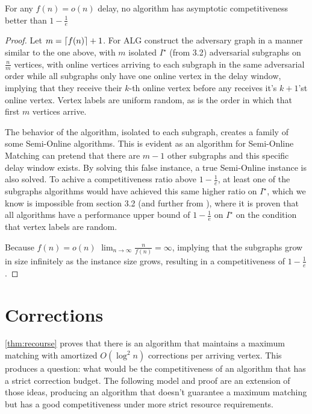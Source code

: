 \begin{theorem}
	For any $f(n)=o(n)$ delay, no algorithm has asymptotic competitiveness better than $1-\frac{1}{e}$
\end{theorem}
\begin{proof}
	Let $m=\left\lceil f(n) \right\rceil+1$.
	For $\mathrm{ALG}$ construct the adversary graph in a manner similar to the one above, with $m$ isolated $I^\star$ (from 3.2) adversarial subgraphs on $\frac{n}{m}$ vertices, with online vertices arriving to each subgraph in the same adversarial order while all subgraphs only have one online vertex in the delay window, implying that they receive their $k$-th online vertex before any receives it's $k+1$'st online vertex. Vertex labels are uniform random, as is the order in which that first $m$ vertices arrive.

	The behavior of the algorithm, isolated to each subgraph, creates a family of some Semi-Online algorithms. This is evident as an algorithm for Semi-Online Matching can pretend that there are $m-1$ other subgraphs and this specific delay window exists. By solving this false instance, a true Semi-Online instance is also solved. To achive a competitiveness ratio above $1-\frac{1}{e}$, at least one of the subgraphs algorithms would have achieved this same higher ratio on $I^\star$, which we know is impossible from section 3.2 (and further from \cite{karp}), where it is proven that all algorithms have a performance upper bound of $1-\frac{1}{e}$ on $I^\star$ on the condition that vertex labels are random.
	
	Because $f(n)=o(n)$ $\lim_{n\to\infty}\frac{n}{f(n)}=\infty$, implying that the subgraphs grow in size infinitely as the instance size grows, resulting in a competitiveness of $1-\frac{1}{e}$.
\end{proof}

\section{Corrections}
\autoref{thm:recourse} proves that there is an algorithm that maintains a maximum matching with amortized $O(\log^2n)$ corrections per arriving vertex. This produces a question: what would be the competitiveness of an algorithm that has a strict correction budget. The following model and proof are an extension of those ideas, producing an algorithm that doesn't guarantee a maximum matching but has a good competitiveness under more strict resource requirements.


